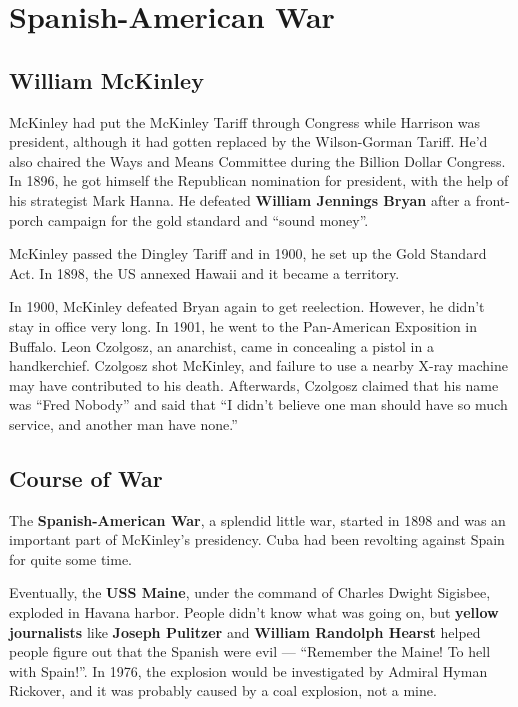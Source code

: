 \section{Spanish-American War}

\subsection*{William McKinley}

McKinley had put the McKinley Tariff through Congress while Harrison was president,
although it had gotten replaced by the Wilson-Gorman Tariff.
He'd also chaired the Ways and Means Committee during the Billion Dollar Congress.
In 1896, he got himself the Republican nomination for president,
with the help of his strategist Mark Hanna.
He defeated \textbf{William Jennings Bryan} after a front-porch campaign for the gold standard and ``sound money''.

McKinley passed the Dingley Tariff and in 1900, he set up the Gold Standard Act.
In 1898, the US annexed Hawaii and it became a territory.

In 1900, McKinley defeated Bryan again to get reelection.
However, he didn't stay in office very long.
In 1901, he went to the Pan-American Exposition in Buffalo.
Leon Czolgosz, an anarchist, came in concealing a pistol in a handkerchief.
Czolgosz shot McKinley, and failure to use a nearby X-ray machine may have contributed to his death.
Afterwards, Czolgosz claimed that his name was ``Fred Nobody''
and said that ``I didn't believe one man should have so much service, and another man have none.''

\subsection*{Course of War}

The \textbf{Spanish-American War}, a splendid little war,
started in 1898 and was an important part of McKinley's presidency.
Cuba had been revolting against Spain for quite some time.

Eventually, the \textbf{USS Maine}, under the command of Charles Dwight Sigisbee, exploded in Havana harbor.
People didn't know what was going on,
but \textbf{yellow journalists} like \textbf{Joseph Pulitzer} and \textbf{William Randolph Hearst}
helped people figure out that the Spanish were evil ---
``Remember the Maine! To hell with Spain!''.
In 1976, the explosion would be investigated by Admiral Hyman Rickover,
and it was probably caused by a coal explosion, not a mine.


